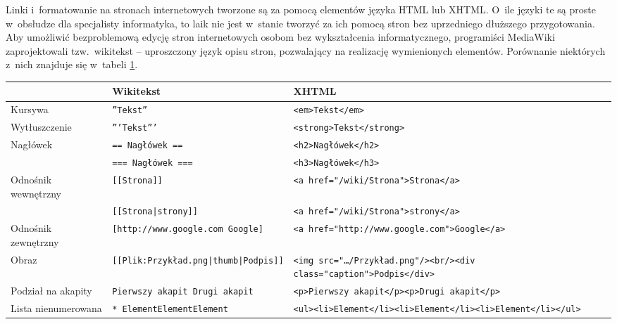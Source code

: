 \documentclass{pracamgr}
\begin{document}
Linki i~formatowanie na stronach internetowych tworzone są za pomocą elementów języka HTML lub XHTML. O~ile języki te są proste w~obsłudze dla specjalisty informatyka, to laik nie jest w~stanie tworzyć za ich pomocą stron bez uprzedniego dłuższego przygotowania. Aby umożliwić bezproblemową edycję stron internetowych osobom bez wykształcenia informatycznego, programiści MediaWiki zaprojektowali tzw.\ wikitekst -- uproszczony język opisu stron, pozwalający na realizację wymienionych elementów. Porównanie niektórych z~nich znajduje się w~tabeli \ref{html-wiki}.

\begin{table}[h]
\begin{center}
\label{html-wiki}
\footnotesize{
	\begin{tabularx}{\textwidth}{ |l|X|X| }
		\hline & Wikitekst & XHTML \\
		\hline
		\hline Kursywa & \texttt{''Tekst''} & \texttt{<em>Tekst</em>} \\
		\hline Wytłuszczenie & \texttt{'''Tekst'''} & \texttt{<strong>Tekst</strong>} \\
		\hline Nagłówek & \texttt{== Nagłówek ==} & \texttt{<h2>Nagłówek</h2>} \\
		 & \texttt{=== Nagłówek ===} & \texttt{<h3>Nagłówek</h3>} \\
		\hline Odnośnik wewnętrzny & \texttt{[[Strona]]} & \texttt{<a href="/wiki/Strona">Strona</a>} \\
		 & \texttt{[[Strona|strony]]} & \texttt{<a href="/wiki/Strona">strony</a>} \\
		\hline Odnośnik zewnętrzny & \texttt{[http://www.google.com Google]}
		 & \texttt{<a href="http://www.google.com">\newline Google</a>} \\
		\hline Obraz & \texttt{[[Plik:Przykład.png|thumb|Podpis]]} & \texttt{<img src="\dots /Przykład.png"/><br/>\newline <div class="caption">Podpis</div>} \\
		\hline Podział na akapity & \texttt{Pierwszy akapit \newline \newline Drugi akapit}
		 & \texttt{<p>Pierwszy akapit</p>\newline <p>Drugi akapit</p>} \\
		\hline Lista nienumerowana & \texttt{* Element\newline * Element\newline * Element}
		 & \texttt{<ul>\newline <li>Element</li>\newline <li>Element</li>\newline <li>Element</li>\newline </ul>}\\

\end{tabularx}}
\end{center}
\end{table}
\end{document}
